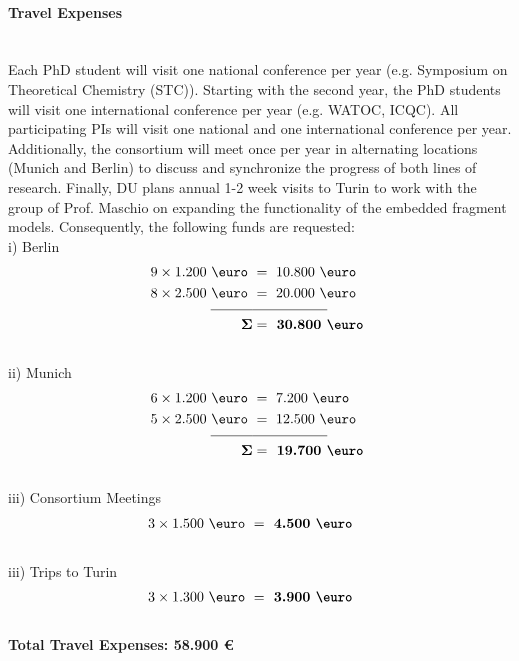 \documentclass[a4paper,11pt,headings=normal]{scrartcl}
\begin{document}
\paragraph{Travel Expenses}\ \\
Each PhD student will visit one national conference per year (e.g. Symposium on 
Theoretical Chemistry (STC)). Starting with the second year, the PhD students 
will visit one international conference per year (e.g. WATOC, ICQC). 
All participating PIs will visit one national and one international conference per year.
Additionally, the consortium will meet once per year in alternating locations 
(Munich and Berlin) to discuss and synchronize the progress of both lines of 
research. Finally, DU plans annual 1-2 week visits to Turin to work with the group of Prof. Maschio on expanding the functionality of the embedded fragment models. Consequently, the following funds are requested:\\
i) Berlin
\begin{align*}
	\text{9} \times \text{1.200 \euro } &= \text{ 10.800 \euro 
	}\\
	\text{8} \times  \text{2.500 \euro } &= \text{ 20.000 \euro 
	}\\[-0.75em]
	\underline{\quad\qquad}&\underline{\qquad \qquad \quad\ }\\
	\mathbf{\Sigma} &= \textbf{ 30.800 \euro }
\end{align*}
\ \\
ii) Munich
\begin{align*}
	\text{6} \times \text{1.200 \euro } &= \text{ 7.200 \euro 
	}\\
	\text{5} \times  \text{2.500 \euro } &= \text{ 12.500 \euro 
	}\\[-0.75em]
	\underline{\quad\qquad}&\underline{\qquad \qquad \quad\ }\\
	\mathbf{\Sigma} &= \textbf{ 19.700 \euro }
\end{align*}
\ \\
iii) Consortium Meetings
\begin{align*}
	\text{3} \times\text{1.500 \euro } &= \textbf{ 4.500 \euro }
\end{align*}
\ \\
iii) Trips to Turin
\begin{align*}
	\text{3} \times \text{1.300 \euro } &= \textbf{ 3.900 \euro }
\end{align*}
\ \\


\textbf{Total Travel Expenses: 58.900 \euro}
\end{document}
